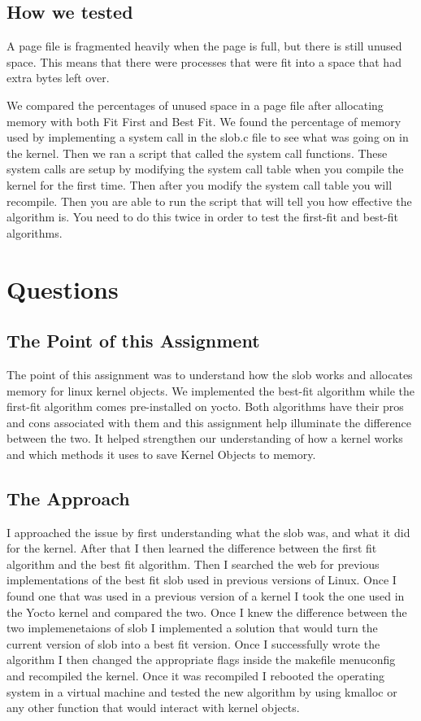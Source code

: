 \documentclass[onecolumn, draftclsnofoot,10pt, compsoc]{IEEEtran}
\begin{document}
 \subsection{How we tested}
 A page file is fragmented heavily when the page is full, but there is still unused space. This means that there were processes that were fit into a space that had extra bytes left over.
 
 We compared the percentages of unused space in a page file after allocating memory with both Fit First and Best Fit. We found the percentage of memory used by implementing a system call in the slob.c file to see what was going on in the kernel. Then we ran a script that called the system call functions. These system calls are setup by modifying the system call table when you compile the kernel for the first time. Then after you modify the system call table you will recompile. Then you are able to run the script that will tell you how effective the algorithm is. You need to do this twice in order to test the first-fit and best-fit algorithms.
 
 \section{Questions}
    
    \subsection{The Point of this Assignment}
        The point of this assignment was to understand how the slob works and allocates memory for linux kernel objects. We implemented the best-fit algorithm while the first-fit algorithm comes pre-installed on yocto. Both algorithms have their pros and cons associated with them and this assignment help illuminate the difference between the two. It helped strengthen our understanding of how a kernel works and which methods it uses to save Kernel Objects to memory.
        
        \subsection{The Approach}
    I approached the issue by first understanding what the slob was, and what it did for the kernel. After that I then learned the difference between the first fit algorithm and the best fit algorithm. Then I searched the web for previous implementations of the best fit slob used in previous versions of Linux. Once I found one that was used in a previous version of a kernel I took the one used in the Yocto kernel and compared the two. Once I knew the difference between the two implemenetaions of slob I implemented a solution that would turn the current version of slob into a best fit version. Once I successfully wrote the algorithm I then changed the appropriate flags inside the makefile menuconfig and recompiled the kernel. Once it was recompiled I rebooted the operating system in a virtual machine and tested the new algorithm by using kmalloc or any other function that would interact with kernel objects.
    
\end{document}
